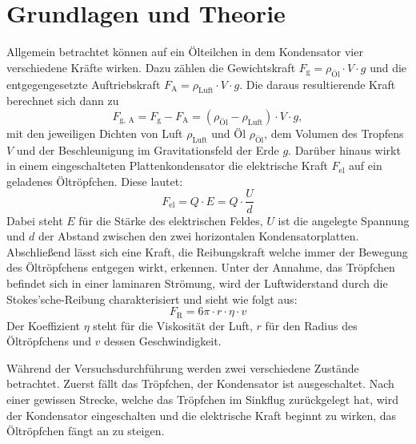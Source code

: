 
\section{Grundlagen und Theorie}
Allgemein betrachtet können auf ein Ölteilchen in dem Kondensator vier verschiedene Kräfte wirken. Dazu zählen die Gewichtskraft $F_{\text{g}} = \rho_{\text{Öl}} \cdot V \cdot g$ und die entgegengesetzte Auftriebskraft $F_{\text{A}} = \rho_{\text{Luft}} \cdot V \cdot g$. Die daraus resultierende Kraft berechnet sich dann zu
\begin{equation}
	F_{\text{g, A}} = F_{\text{g}} - F_{\text{A}} = (\rho_{\text{Öl}} - \rho_{\text{Luft}}) \cdot V \cdot g,
\end{equation}
mit den jeweiligen Dichten von Luft \( \rho_{\text{Luft}} \) und Öl \( \rho_{\text{Öl}} \), dem Volumen des Tropfens \( V \) und der Beschleunigung im Gravitationsfeld der Erde \( g \). Darüber hinaus wirkt in einem eingeschalteten Plattenkondensator die elektrische Kraft $F_{\text{el}}$ auf ein geladenes Öltröpfchen. Diese lautet:
\begin{equation}
	F_{\text{el}} = Q \cdot E = Q \cdot \frac{U}{d}
\end{equation}
Dabei steht \( E \) für die Stärke des elektrischen Feldes, \( U \) ist die angelegte Spannung und \( d \) der Abstand zwischen den zwei horizontalen Kondensatorplatten. 
Abschließend lässt sich eine Kraft, die Reibungskraft welche immer der Bewegung des Öltröpfchens entgegen wirkt, erkennen. Unter der Annahme, das Tröpfchen befindet sich in einer laminaren Strömung, wird der Luftwiderstand durch die Stokes'sche-Reibung charakterisiert und sieht wie folgt aus:
\begin{equation}
	F_{\text{R}} =  6 \pi \cdot r \cdot \eta \cdot v 
\end{equation}
Der Koeffizient $ \eta $ steht für die Viskosität der Luft, $ r $ für den Radius des Öltröpfchens und $v$ dessen Geschwindigkeit. 

Während der Versuchsdurchführung werden zwei verschiedene Zustände betrachtet. Zuerst fällt das Tröpfchen, der Kondensator ist ausgeschaltet. Nach einer gewissen Strecke, welche das Tröpfchen im Sinkflug zurückgelegt hat, wird der Kondensator eingeschalten und die elektrische Kraft beginnt zu wirken, das Öltröpfchen fängt an zu steigen. 

